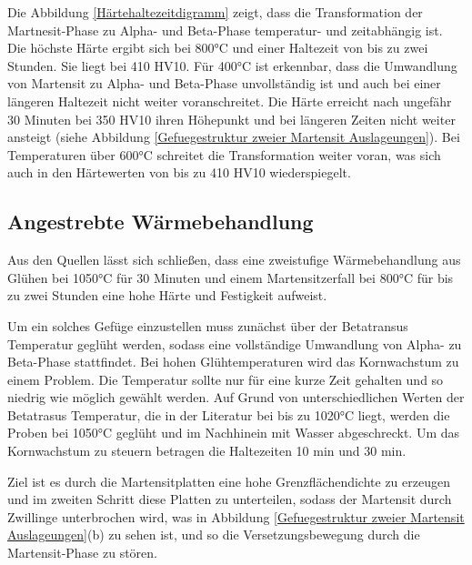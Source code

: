 \documentclass[a4paper, 11pt]{tubsreprt}
\begin{document}
Die Abbildung \ref{Härtehaltezeitdigramm} zeigt, dass die Transformation der Martnesit-Phase zu Alpha- und Beta-Phase temperatur- und zeitabhängig ist. Die höchste Härte ergibt sich bei 800°C und einer Haltezeit von bis zu zwei Stunden. Sie liegt bei 410 HV10. Für 400°C ist erkennbar, dass die Umwandlung von Martensit zu Alpha- und Beta-Phase unvollständig ist und auch bei einer längeren Haltezeit nicht weiter voranschreitet. Die Härte erreicht nach ungefähr 30 Minuten bei 350 HV10 ihren Höhepunkt und bei längeren Zeiten nicht weiter ansteigt (siehe Abbildung \ref{Gefuegestruktur zweier Martensit Auslageungen}). Bei Temperaturen über 600°C schreitet die Transformation weiter voran, was sich auch in den Härtewerten von bis zu 410 HV10 wiederspiegelt. 

\subsection{Angestrebte Wärmebehandlung}
Aus den Quellen lässt sich schließen, dass eine zweistufige Wärmebehandlung aus Glühen bei 1050°C für 30 Minuten und einem Martensitzerfall bei 800°C für bis zu zwei Stunden eine hohe Härte und Festigkeit aufweist.

Um ein solches Gefüge einzustellen muss zunächst über der Betatransus Temperatur geglüht werden, sodass eine vollständige Umwandlung von Alpha- zu Beta-Phase stattfindet. Bei hohen Glühtemperaturen wird das Kornwachstum zu einem Problem. Die Temperatur sollte nur für eine kurze Zeit gehalten und so niedrig wie möglich gewählt werden. Auf Grund von unterschiedlichen Werten der Betatrasus Temperatur, die in der Literatur bei bis zu 1020°C liegt\cite{Tarin1995}, werden die Proben bei 1050°C geglüht und im Nachhinein mit Wasser abgeschreckt. Um das Kornwachstum zu steuern betragen die Haltezeiten 10 min und 30 min. 


Ziel ist es durch die Martensitplatten eine hohe Grenzflächendichte zu erzeugen und im zweiten Schritt diese Platten zu unterteilen, sodass der Martensit durch Zwillinge unterbrochen wird, was in Abbildung \ref{Gefuegestruktur zweier Martensit Auslageungen}(b) zu sehen ist, und so die Versetzungsbewegung durch die Martensit-Phase zu stören.
\end{document}
